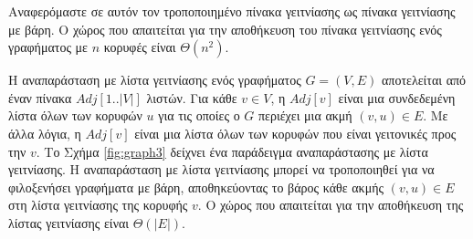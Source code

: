 \documentclass[12pt,a4paper]{article}
\begin{document}
Αναφερόμαστε σε αυτόν τον τροποποιημένο πίνακα γειτνίασης ως πίνακα γειτνίασης με βάρη. Ο χώρος που απαιτείται για την αποθήκευση του πίνακα γειτνίασης ενός γραφήματος με $n$ κορυφές είναι $\Theta(n^2)$.

Η αναπαράσταση με λίστα γειτνίασης ενός γραφήματος $G = (V, E)$ αποτελείται από έναν πίνακα $Adj[1..|V|]$ λιστών. Για κάθε $v \in V$, η $Adj[v]$ είναι μια συνδεδεμένη λίστα όλων των κορυφών $u$ για τις οποίες ο $G$ περιέχει μια ακμή $(v, u) \in E$. Με άλλα λόγια, η $Adj[v]$ είναι μια λίστα όλων των κορυφών που είναι γειτονικές προς την $v$. Το Σχήμα \ref{fig:graph3} δείχνει ένα παράδειγμα αναπαράστασης με λίστα γειτνίασης. Η αναπαράσταση με λίστα γειτνίασης μπορεί να τροποποιηθεί για να φιλοξενήσει γραφήματα με βάρη,  αποθηκεύοντας το βάρος κάθε ακμής $(v, u) \in E$ στη λίστα γειτνίασης της κορυφής $v$. Ο χώρος που απαιτείται για την αποθήκευση της λίστας γειτνίασης είναι $\Theta(|E|)$.
\end{document}
